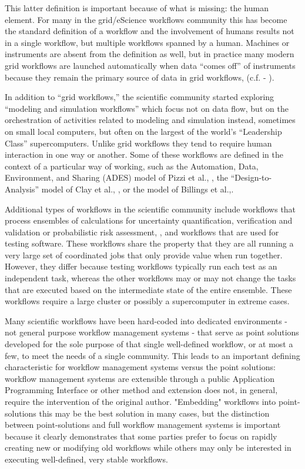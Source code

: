 This latter definition is important because of what is missing: the human
element. For many in the grid/eScience workflows community this has become the
standard definition of a workflow and the involvement of humans results not in a
single workflow, but multiple workflows spanned by a human.  Machines or
instruments are absent from the definition as well, but in practice many modern
grid workflows are launched automatically when data ``comes off'' of instruments
because they remain the primary source of data in grid workflows, (c.f. -
\cite{megino_panda:_2015}).

In addition to ``grid workflows,'' the scientific community started exploring
``modeling and simulation workflows'' which focus not on data flow, but on the
orchestration of activities related to modeling and simulation instead,
sometimes on small local computers, but often on the largest of the world's
``Leadership Class'' supercomputers. Unlike grid workflows they tend to require
human interaction in one way or another.  Some of these workflows are defined in
the context of a particular way of working, such as the Automation, Data,
Environment, and Sharing (ADES) model of Pizzi et al., \cite{pizzi_aiida:_2016},
the ``Design-to-Analysis'' model of Clay et al., \cite{clay_incorporating_2015},
or the model of Billings et al.,\cite{billings_eclipse_2017}.

Additional types of workflows in the scientific community include workflows that
process ensembles of calculations for uncertainty quantification, verification
and validation or probabilistic risk assessment, \cite{montoya_apex_2016}, and
workflows that are used for testing software. These workflows share the property
that they are all running a very large set of coordinated jobs that only provide
value when run together. However, they differ because testing workflows
typically run each test as an independent task, whereas the other workflows may
or may not change the tasks that are executed based on the intermediate state of
the entire ensemble. These workflows require a large cluster or possibly a
supercomputer in extreme cases.

Many scientific workflows have been hard-coded into dedicated environments - not
general purpose workflow management systems - that serve as point solutions
developed for the sole purpose of that single well-defined workflow, or at most
a few, to meet the needs of a single community. This leads to an important
defining characteristic for workflow management systems versus the point
solutions: workflow management systems are extensible through a public
Application Programming Interface or other method and extension does not, in
general, require the intervention of the original author. "Embedding" workflows
into point-solutions this may be the best solution in many cases, but the
distinction between point-solutions and full workflow management systems is
important because it clearly demonstrates  that some parties prefer to focus on
rapidly creating new or modifying old workflows while others may only be
interested in executing well-defined, very stable workflows.

